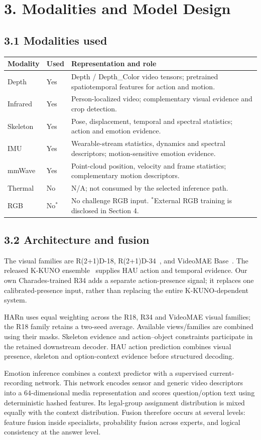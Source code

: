 \documentclass[12pt,a4paper]{article}
\newcommand{\pageheading}[1]{\vspace*{-5pt}\section*{#1}}
\begin{document}
\pageheading{3. Modalities and Model Design}
\subsection*{3.1 Modalities used}
\begin{tabularx}{\linewidth}{@{}L{22mm}L{12mm}Y@{}}
\toprule
Modality & Used & Representation and role\\
\midrule
Depth & Yes & Depth / Depth\_Color video tensors; pretrained spatiotemporal features for action and motion.\\
Infrared & Yes & Person-localized video; complementary visual evidence and crop detection.\\
Skeleton & Yes & Pose, displacement, temporal and spectral statistics; action and emotion evidence.\\
IMU & Yes & Wearable-stream statistics, dynamics and spectral descriptors; motion-sensitive emotion evidence.\\
mmWave & Yes & Point-cloud position, velocity and frame statistics; complementary motion descriptors.\\
Thermal & No & N/A; not consumed by the selected inference path.\\
RGB & No$^*$ & No challenge RGB input. $^*$External RGB training is disclosed in Section 4.\\
\bottomrule
\end{tabularx}

\subsection*{3.2 Architecture and fusion}
The visual families are R(2+1)D-18, R(2+1)D-34~\cite{r2plus1d}, and VideoMAE Base~\cite{videomae}. The released K-KUNO ensemble~\cite{kuno} supplies HAU action and temporal evidence. Our own Charades-trained R34 adds a separate action-presence signal; it replaces one calibrated-presence input, rather than replacing the entire K-KUNO-dependent system.

HARn uses equal weighting across the R18, R34 and VideoMAE visual families; the R18 family retains a two-seed average. Available views/families are combined using their masks. Skeleton evidence and action--object constraints participate in the retained downstream decoder. HAU action prediction combines visual presence, skeleton and option-context evidence before structured decoding.

Emotion inference combines a context predictor with a supervised current-recording network. This network encodes sensor and generic video descriptors into a 64-dimensional media representation and scores question/option text using deterministic hashed features. Its legal-group assignment distribution is mixed equally with the context distribution. Fusion therefore occurs at several levels: feature fusion inside specialists, probability fusion across experts, and logical consistency at the answer level.
\end{document}

